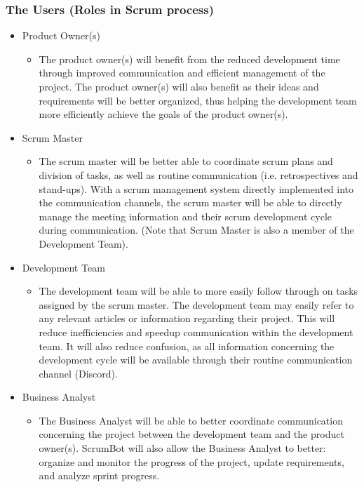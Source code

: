 \documentclass[12pt, titlepage]{article}
\begin{document}
\subsubsection{The Users (Roles in Scrum process)}
\begin{itemize}
    \item Product Owner(s)
    \begin{itemize}
      \item[] The product owner(s) will benefit from the reduced development time through improved communication and efficient management of the project. The product owner(s) will also benefit as their ideas and requirements will be better organized, thus helping the development team more efficiently achieve the goals of the product owner(s).
    \end{itemize}
    \item Scrum Master
    \begin{itemize}
      \item[] The scrum master will be better able to coordinate scrum plans and division of tasks, as well as routine communication (i.e. retrospectives and stand-ups). With a scrum management system directly implemented into the communication channels, the scrum master will be able to directly manage the meeting information and their scrum development cycle during communication. (Note that Scrum Master is also a member of the Development Team).
    \end{itemize}
    \item Development Team
    \begin{itemize}
      \item[] The development team will be able to more easily follow through on tasks assigned by the scrum master. The development team may easily refer to any relevant articles or information regarding their project. This will reduce inefficiencies and speedup communication within the development team. It will also reduce confusion, as all information concerning the development cycle will be available through their routine communication channel (Discord).
    \end{itemize}
    \item Business Analyst
    \begin{itemize}
      \item[] The Business Analyst will be able to better coordinate communication concerning the project between the development team and the product owner(s). ScrumBot will also allow the Business Analyst to better: organize and monitor the progress of the project, update requirements, and analyze sprint progress.
    \end{itemize}
\end{itemize}
\end{document}
